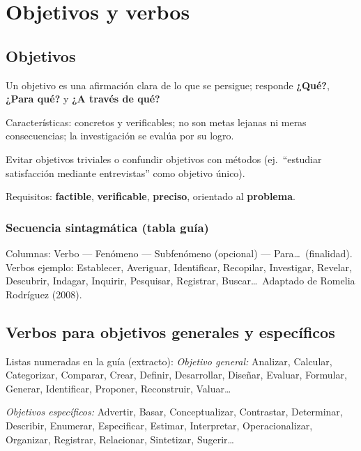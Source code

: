 \documentclass[a4paper,11pt]{book}
\begin{document}
\chapter{Objetivos y verbos}
\label{cap:objetivos}

\section{Objetivos}
Un objetivo es una afirmación clara de lo que se persigue; responde \textbf{¿Qué?}, \textbf{¿Para qué?} y \textbf{¿A través de qué?}

Características: concretos y verificables; no son metas lejanas ni meras consecuencias; la investigación se evalúa por su logro.

Evitar objetivos triviales o confundir objetivos con métodos (ej.\ ``estudiar satisfacción mediante entrevistas'' como objetivo único).

Requisitos: \textbf{factible}, \textbf{verificable}, \textbf{preciso}, orientado al \textbf{problema}.

\subsection*{Secuencia sintagmática (tabla guía)}
Columnas: Verbo --- Fenómeno --- Subfenómeno (opcional) --- Para\ldots\ (finalidad). Verbos ejemplo: Establecer, Averiguar, Identificar, Recopilar, Investigar, Revelar, Descubrir, Indagar, Inquirir, Pesquisar, Registrar, Buscar\ldots\ Adaptado de Romelia Rodríguez (2008).

\section{Verbos para objetivos generales y específicos}
Listas numeradas en la guía (extracto): \textit{Objetivo general:} Analizar, Calcular, Categorizar, Comparar, Crear, Definir, Desarrollar, Diseñar, Evaluar, Formular, Generar, Identificar, Proponer, Reconstruir, Valuar\ldots

\textit{Objetivos específicos:} Advertir, Basar, Conceptualizar, Contrastar, Determinar, Describir, Enumerar, Especificar, Estimar, Interpretar, Operacionalizar, Organizar, Registrar, Relacionar, Sintetizar, Sugerir\ldots
\end{document}
